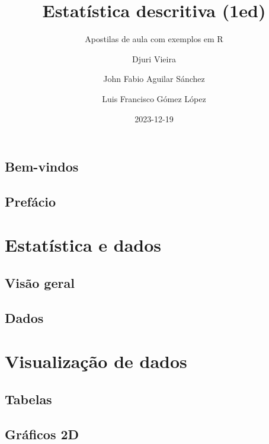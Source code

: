 \documentclass[
  letterpaper,
]{book}
\title{Estatística descritiva (1ed)}
\subtitle{Apostilas de aula com exemplos em R}
\author{Djuri Vieira \and John Fabio Aguilar Sánchez \and Luis Francisco
Gómez López}
\date{2023-12-19}
\renewcommand*\contentsname{Índice}
\newcommand\contentsname{Índice}
\theoremstyle{definition}
\theoremstyle{plain}
\theoremstyle{remark}
\begin{document}
\frontmatter
\maketitle

\renewcommand*\contentsname{Índice}
{
\hypersetup{linkcolor=}
\setcounter{tocdepth}{2}
\tableofcontents
}
\mainmatter
{}

\chapter*{Bem-vindos}\label{bem-vindos}



\chapter*{Prefácio}\label{prefuxe1cio}


\part{Estatística e dados}

\chapter{Visão geral}\label{visuxe3o-geral}

\chapter{Dados}\label{dados}

\part{Visualização de dados}

\chapter{Tabelas}\label{tabelas}

\chapter{Gráficos 2D}\label{gruxe1ficos-2d}
\end{document}
